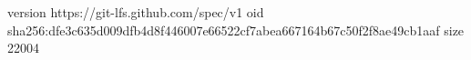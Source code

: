 version https://git-lfs.github.com/spec/v1
oid sha256:dfe3c635d009dfb4d8f446007e66522cf7abea667164b67c50f2f8ae49cb1aaf
size 22004
